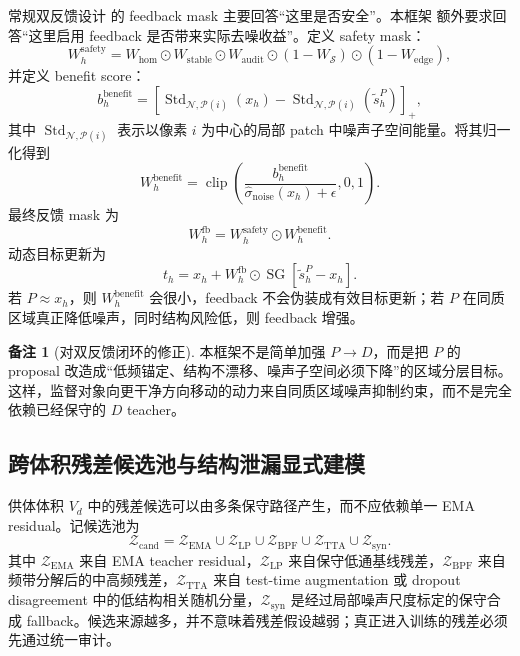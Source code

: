 \documentclass[11pt,a4paper,UTF8,fontset=fandol]{ctexart}
\theoremstyle{definition}
\newtheorem{remark}[theorem]{备注}
\DeclareMathOperator{\SG}{SG}
\DeclareMathOperator{\Std}{Std}
\DeclareMathOperator{\clip}{clip}
\newcommand{\cZ}{\mathcal{Z}}
\begin{document}
常规双反馈设计 的 feedback mask 主要回答“这里是否安全”。本框架 额外要求回答“这里启用 feedback 是否带来实际去噪收益”。定义 safety mask：
\begin{equation}
\label{eq:safety-mask-coreC}
    W_h^{\mathrm{safety}}
    =W_{\mathrm{hom}}\odot W_{\mathrm{stable}}\odot W_{\mathrm{audit}}\odot(1-W_{\mathcal S})\odot(1-W_{\mathrm{edge}}),
\end{equation}
并定义 benefit score：
\begin{equation}
\label{eq:benefit-score-coreC}
    b_h^{\mathrm{benefit}}
    =\left[
    \Std_{\mathcal N,\mathcal P(i)}(x_h)
    -\Std_{\mathcal N,\mathcal P(i)}(\tilde s_h^P)
    \right]_+,
\end{equation}
其中 $\Std_{\mathcal N,\mathcal P(i)}$ 表示以像素 $i$ 为中心的局部 patch 中噪声子空间能量。将其归一化得到
\begin{equation}
\label{eq:w-benefit-coreC}
    W_h^{\mathrm{benefit}}
    =\clip\left(
    \frac{b_h^{\mathrm{benefit}}}{\widehat\sigma_{\mathrm{noise}}(x_h)+\epsilon},0,1
    \right).
\end{equation}
最终反馈 mask 为
\begin{equation}
\label{eq:w-feedback-coreC}
    W_h^{\mathrm{fb}}=W_h^{\mathrm{safety}}\odot W_h^{\mathrm{benefit}}.
\end{equation}
动态目标更新为
\begin{equation}
\label{eq:target-coreC}
    t_h=x_h+W_h^{\mathrm{fb}}\odot \SG[\tilde s_h^P-x_h].
\end{equation}
若 $P\approx x_h$，则 $W_h^{\mathrm{benefit}}$ 会很小，feedback 不会伪装成有效目标更新；若 $P$ 在同质区域真正降低噪声，同时结构风险低，则 feedback 增强。

\begin{remark}[对双反馈闭环的修正]
 本框架不是简单加强 $P\to D$，而是把 $P$ 的 proposal 改造成“低频锚定、结构不漂移、噪声子空间必须下降”的区域分层目标。这样，监督对象向更干净方向移动的动力来自同质区域噪声抑制约束，而不是完全依赖已经保守的 $D$ teacher。
\end{remark}

\subsection{跨体积残差候选池与结构泄漏显式建模}

供体体积 $V_d$ 中的残差候选可以由多条保守路径产生，而不应依赖单一 EMA residual。记候选池为
\begin{equation}
\label{eq:zcand-auditA}
    \cZ_{\mathrm{cand}}
    =\cZ_{\mathrm{EMA}}
    \cup\cZ_{\mathrm{LP}}
    \cup\cZ_{\mathrm{BPF}}
    \cup\cZ_{\mathrm{TTA}}
    \cup\cZ_{\mathrm{syn}}.
\end{equation}
其中 $\cZ_{\mathrm{EMA}}$ 来自 EMA teacher residual，$\cZ_{\mathrm{LP}}$ 来自保守低通基线残差，$\cZ_{\mathrm{BPF}}$ 来自频带分解后的中高频残差，$\cZ_{\mathrm{TTA}}$ 来自 test-time augmentation 或 dropout disagreement 中的低结构相关随机分量，$\cZ_{\mathrm{syn}}$ 是经过局部噪声尺度标定的保守合成 fallback。候选来源越多，并不意味着残差假设越弱；真正进入训练的残差必须先通过统一审计。
\end{document}
